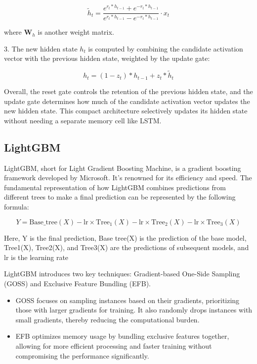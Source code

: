 \documentclass{ieeeojies}
\begin{document}
\[ \tilde{h}_t = \frac{{e^{r_t \ast h_{t-1}} + e^{-r_t \ast h_{t-1}}}}{{e^{r_t \ast h_{t-1}} - e^{-r_t \ast h_{t-1}}}} \cdot x_t \]

where \( \mathbf{W}_h \) is another weight matrix.

 3. The new hidden state \( h_t \) is computed by combining the candidate activation vector with the previous hidden state, weighted by the update gate:

\[ h_t = (1 - z_t) \ast h_{t-1} + z_t \ast \tilde{h}_t \]

 Overall, the reset gate controls the retention of the previous hidden state, and the update gate determines how much of the candidate activation vector updates the new hidden state. This compact architecture selectively updates its hidden state without needing a separate memory cell like LSTM.
 \subsection{LightGBM}
 LightGBM, short for Light Gradient Boosting Machine, is a gradient boosting framework developed by Microsoft. It’s renowned for its efficiency and speed. The fundamental representation of how LightGBM combines predictions from different trees to make a final prediction can be represented by the following formula:

\[ 
Y = \text{Base\_tree}(X) - \text{lr} \times \text{Tree}_{1}(X) - \text{lr} \times \text{Tree}_{2}(X) - \text{lr} \times \text{Tree}_{3}(X) 
\]

 Here, Y is the final prediction, Base tree(X) is the prediction of the base model, Tree1(X), Tree2(X), and Tree3(X) are the predictions of subsequent models, and lr is the learning rate

 LightGBM introduces two key techniques: Gradient-based One-Side Sampling (GOSS) and Exclusive Feature Bundling (EFB).
 
 \begin{itemize}
    \item GOSS focuses on sampling instances based on their gradients, prioritizing those with larger gradients for training. It also randomly drops instances with small gradients, thereby reducing the computational burden.
    \item EFB optimizes memory usage by bundling exclusive features together, allowing for more efficient processing and faster training without compromising the performance significantly.
 \end{itemize}
\end{document}
